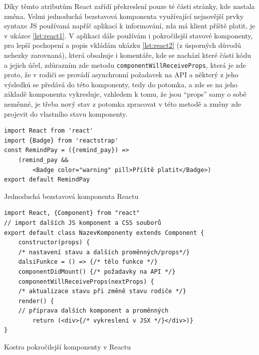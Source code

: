     Díky těmto atributům React zařídí překreslení pouze té části stránky, kde nastala změna. Velmi jednoduchá bezstavová komponenta využívající nejnovější prvky syntaxe JS používaná napříč aplikací k informování, zda má klient příště platit, je v ukázce \ref{lst:react1}. V aplikaci dále používám i pokročilejší stavové komponenty, pro lepší pochopení a popis vkládám ukázku \ref{lst:react2} (z úsporných důvodů nehezky zarovnaná), která obsahuje i komentáře, kde se nachází které části kódu a jejich účel, zdůrazním zde metodu \verb|componentWillReceiveProps|, která je zde proto, že v rodiči se provádí asynchronní požadavek na API a některý z jeho výsledků se předává do této komponenty, tedy do potomka, a zde se na jeho základě komponenta vykresluje, vzhledem k tomu, že jsou \enquote{props} samy o sobě neměnné, je třeba nový stav z potomka zpracovat v této metodě a změny zde projevit do vlastního stavu komponenty. 
    
    \begin{listing}
    	\begin{verbatim}
import React from 'react'
import {Badge} from 'reactstrap'
const RemindPay = ({remind_pay}) =>
    (remind_pay && 
        <Badge color="warning" pill>Příště platit</Badge>)
export default RemindPay
    	\end{verbatim}
    	\caption{Jednoduchá bezstavová komponenta Reactu}\label{lst:react1}
    \end{listing}
    
    \begin{listing}[ht]
    	\begin{verbatim}
import React, {Component} from "react"
// import dalších JS komponent a CSS souborů
export default class NazevKomponenty extends Component {
    constructor(props) {
    /* nastavení stavu a dalších proměnných/props*/}
    dalsiFunkce = () => {/* tělo funkce */}
    componentDidMount() {/* požadavky na API */}
    componentWillReceiveProps(nextProps) {
    /* aktualizace stavu při změně stavu rodiče */}
    render() {
    // příprava dalších komponent a proměnných
        return (<div>{/* vykreslení v JSX */}</div>)}
}
    	\end{verbatim}
    	\caption{Kostra pokročilejší komponenty v Reactu}\label{lst:react2}
    \end{listing}
    
